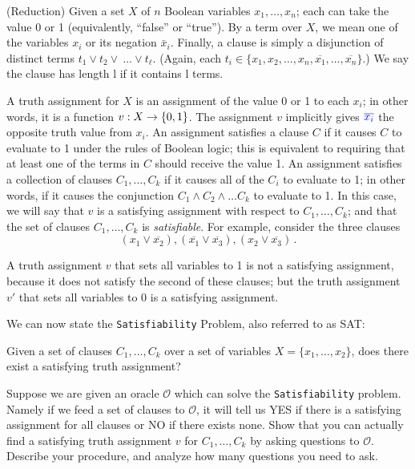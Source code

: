 \begin{questions}
\question (Reduction) Given a set $X$ of $n$ Boolean variables
  $x_1,\ldots,x_n$; each can take the value 0 or 1 (equivalently,
  ``false'' or ``true''). By a term over $X$, we mean one of the
  variables $x_i$ or its negation $\bar x_i$. Finally, a clause is
  simply a disjunction of distinct terms
  $t_1 \vee t_2 \vee \ \ldots \vee t_\ell $.  (Again, each
  $t_i \in \{x_1, x_2,\ldots,x_n, \overline{x_1},\ldots,
  \overline{x_n}\}$.) We say the clause has length l if it contains l
  terms.

  A truth assignment for $X$ is an assignment of the value 0 or 1 to
  each $x_i$; in other words, it is a function $v: X \to \{0,1\}$. The
  assignment $v$ implicitly gives ${\color{blue}{\overline{x_i}}}$ the opposite truth
  value from $x_i$. An assignment satisfies a clause $C$ if it causes
  $C$ to evaluate to 1 under the rules of Boolean logic; this is
  equivalent to requiring that at least one of the terms in $C$ should
  receive the value 1. An assignment satisfies a collection of clauses
  $C_1,\ldots, C_k$ if it causes all of the $C_i$ to evaluate to 1; in
  other words, if it causes the conjunction
  $C_1 \wedge C_2 \wedge \ldots C_k$ to evaluate to 1. In this case,
  we will say that $v$ is a satisfying assignment with respect to
  $C_1,\ldots,C_k$; and that the set of clauses $C_1,\ldots,C_k$ is
  \emph{satisfiable}. For example, consider the three clauses
  \[(x_1 \vee \overline{x_2}), (\overline{x_1} \vee \overline{x_3}),
    (x_2 \vee \overline{x_3}) \, .\]

  A truth assignment $v$ that sets all variables to 1 is not a
  satisfying assignment, because it does not satisfy the second of
  these clauses; but the truth assignment $v'$ that sets all variables
  to 0 is a satisfying assignment.

  We can now state the \texttt{Satisfiability} Problem, also referred
  to as SAT:
  \begin{center}
    Given a set of clauses $C_1, \ldots, C_k$ over a set of variables
    $X = \{ x_1, \ldots, x_2\}$, does there exist a satisfying truth
    assignment?
    \end{center}

    Suppose we are given an oracle $\mathcal{O}$ which can solve the
    \texttt{Satisfiability} problem. Namely if we feed a set of
    clauses to $\mathcal{O}$, it will tell us YES if there is a
    satisfying assignment for all clauses or NO if there exists
    none. Show that you can actually find a satisfying truth
    assignment $v$ for $C_1,\ldots,C_k$ by asking questions to
    $\mathcal{O}$. Describe your procedure, and analyze how many
    questions you need to ask.
\end{questions}



